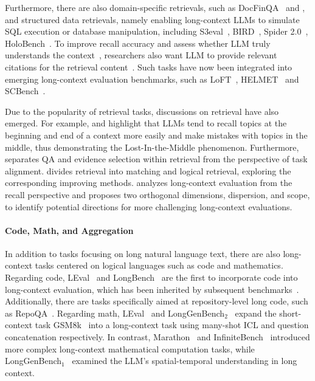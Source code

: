 Furthermore, there are also domain-specific retrievals, such as DocFinQA~\citep{reddy2024docfinqa} and \citet{gupta2024systematic}, and structured data retrievals, namely enabling long-context LLMs to simulate SQL execution or database manipulation, including S3eval~\citep{lei2024s3eval}, BIRD~\citep{li2024can}, Spider 2.0~\citep{lei2024spider}, HoloBench~\citep{maekawa2024holistic}. To improve recall accuracy and assess whether LLM truly understands the context~\citep{gao2023enabling,hilgert2024evaluating,zhang2024longcite}, researchers also want LLM to provide relevant citations for the retrieval content~\citep{buchmann2024attribute,tang2024citeeval}. Such tasks have now been integrated into emerging long-context evaluation benchmarks, such as LoFT~\citep{lee2024can}, HELMET~\citep{yen2024helmet} and SCBench~\citep{li2024scbench}.

Due to the popularity of retrieval tasks, discussions on retrieval have also emerged. For example, \citet{liu2024lost} and \citet{an2023eval} highlight that LLMs tend to recall topics at the beginning and end of a context more easily and make mistakes with topics in the middle, thus demonstrating the Lost-In-the-Middle phenomenon. Furthermore, \citet{koo2024large} separates QA and evidence selection within retrieval from the perspective of task alignment. \citet{yu2024hyper} divides retrieval into matching and logical retrieval, exploring the corresponding improving methods. \citet{goldman2024really} analyzes long-context evaluation from the recall perspective and proposes two orthogonal dimensions, dispersion, and scope, to identify potential directions for more challenging long-context evaluations.

\paragraph{Code, Math, and Aggregation} In addition to tasks focusing on long natural language text, there are also long-context tasks centered on logical languages such as code and mathematics. Regarding code, LEval~\citep{an2023eval} and LongBench~\citep{bai2023longbench} are the first to incorporate code into long-context evaluation, which has been inherited by subsequent benchmarks~\citep{zhang2024bench,bai2024longbench}. Additionally, there are tasks specifically aimed at repository-level long code, such as RepoQA~\citep{liu2024repoqa}. Regarding math, LEval~\citep{an2023eval} and LongGenBench$_2$~\citep{liu2024longgenbench} expand the short-context task GSM8k~\citep{cobbe2021training} into a long-context task using many-shot ICL and question concatenation respectively. In contrast, Marathon~\citep{zhang2023marathon} and InfiniteBench~\citep{zhang2024bench} introduced more complex long-context mathematical computation tasks, while LongGenBench$_1$~\citep{wu2024longgenbench} examined the LLM's spatial-temporal understanding in long context.

